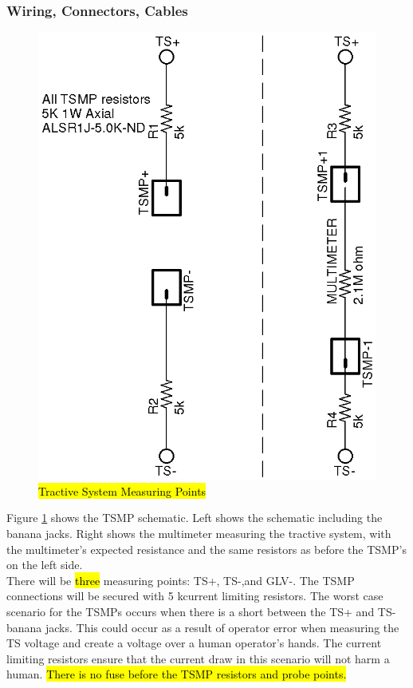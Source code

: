 \documentclass{article}
\DeclareRobustCommand{\hlr}[1]{{\sethlcolor{red}\hl{#1}}}
\begin{document}
        \subsubsection{Wiring, Connectors, Cables}

            \begin{figure}[H]
                \centering
                \includegraphics{TSMP}
                \caption{\hlr{Tractive System Measuring Points}}
                \label{fig:TSMPschematic}
            \end{figure}

            Figure \ref{fig:TSMPschematic} shows the TSMP schematic. Left shows the schematic including the banana jacks. Right shows the multimeter measuring the tractive system, with the multimeter's expected resistance and the same resistors as before the TSMP's on the left side.\\

            There will be \hlr{three} measuring points: TS+, TS-,and GLV-. The TSMP connections will be secured with 5 k\ohm current limiting resistors. The worst case scenario for the TSMPs occurs when there is a short between the TS+ and TS- banana jacks. This could occur as a result of operator error when measuring the TS  voltage and create a voltage over a human operator's hands. The current limiting resistors ensure that the current draw in this scenario will not harm a human. \hlr{There is no fuse before the TSMP resistors and probe points.}
\end{document}
